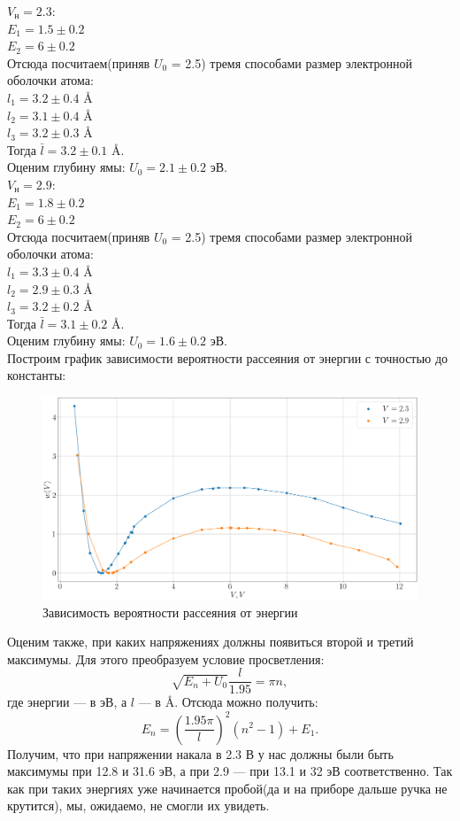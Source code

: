 \documentclass[11pt]{article}
\begin{document}
$V_\text{н} = 2.3$: \\
$E_1 = 1.5 \pm 0.2$ \\
$E_2 = 6 \pm 0.2$ \\
Отсюда посчитаем(приняв $U_0$ = 2.5) тремя способами размер электронной оболочки атома: \\
$l_1 = 3.2 \pm 0.4 $ \AA{} \\
$l_2 = 3.1 \pm 0.4$ \AA{} \\
$l_3 = 3.2 \pm 0.3$ \AA{} \\
Тогда $\bar{l} = 3.2 \pm 0.1$ \AA{}. \\
Оценим глубину ямы: $U_0 = 2.1 \pm 0.2$ эВ. \\

$V_\text{н} = 2.9$: \\
$E_1 = 1.8 \pm 0.2$ \\
$E_2 = 6 \pm 0.2$ \\
Отсюда посчитаем(приняв $U_0$ = 2.5) тремя способами размер электронной оболочки атома: \\
$l_1 = 3.3 \pm 0.4 $ \AA{} \\
$l_2 = 2.9 \pm 0.3$ \AA{} \\
$l_3 = 3.2 \pm 0.2$ \AA{} \\
Тогда $\bar{l} = 3.1 \pm 0.2$ \AA{}. \\
Оценим глубину ямы: $U_0 = 1.6 \pm 0.2$ эВ. \\
Построим график зависимости вероятности рассеяния от энергии с точностью до константы:
\begin{figure}[H]
\centering
\includegraphics[width=0.95\linewidth]{f2.png}
\caption{Зависимость вероятности рассеяния от энергии}
\end{figure}
Оценим также, при каких напряжениях должны появиться второй и третий максимумы. Для этого преобразуем условие просветления:
\[
 \sqrt{E_n + U_0} \frac{l}{1.95} = \pi n,
\]
где энергии --- в эВ, а $l$ --- в \AA{}. Отсюда можно получить:
\[
 E_n = \left(\frac{1.95\pi}{l}\right)^2(n^2 - 1) + E_1.
\]
Получим, что при напряжении накала в 2.3 В у нас должны были быть максимумы при 12.8 и 31.6 эВ, а при 2.9 --- при 13.1 и 32 эВ соответственно. Так как при таких энергиях уже начинается пробой(да и на приборе дальше ручка не крутится), мы, ожидаемо, не смогли их увидеть.
\end{document}
